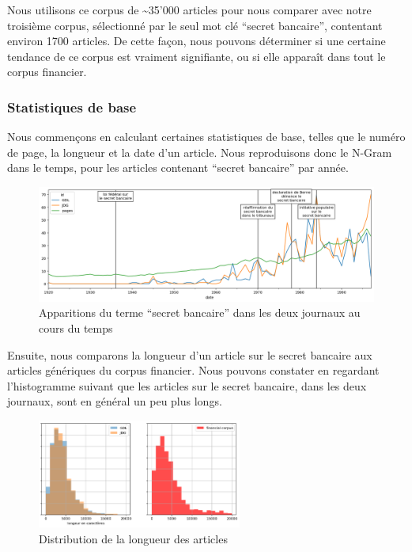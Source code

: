 Nous utilisons ce corpus de \textasciitilde{}35'000 articles pour nous
comparer avec notre troisième corpus, sélectionné par le seul mot clé
``secret bancaire'', contentant environ 1700 articles. De cette façon,
nous pouvons déterminer si une certaine tendance de ce corpus est
vraiment signifiante, ou si elle apparaît dans tout le corpus financier.

\hypertarget{statistiques-de-base}{%
\subsubsection{Statistiques de base}\label{statistiques-de-base}}

Nous commençons en calculant certaines statistiques de base, telles que
le numéro de page, la longueur et la date d'un article. Nous
reproduisons donc le N-Gram dans le temps, pour les articles contenant
``secret bancaire'' par année.

\begin{figure}
\centering
\includegraphics{ngram_ts.png}
\caption{Apparitions du terme ``secret bancaire'' dans les deux journaux
au cours du temps}
\end{figure}

Ensuite, nous comparons la longueur d'un article sur le secret bancaire
aux articles génériques du corpus financier. Nous pouvons constater en
regardant l'histogramme suivant que les articles sur le secret bancaire,
dans les deux journaux, sont en général un peu plus longs.

\begin{figure}
\centering
\includegraphics[width=0.6\textwidth,height=\textheight]{article_lengths.png}
\caption{Distribution de la longueur des articles}
\end{figure}

